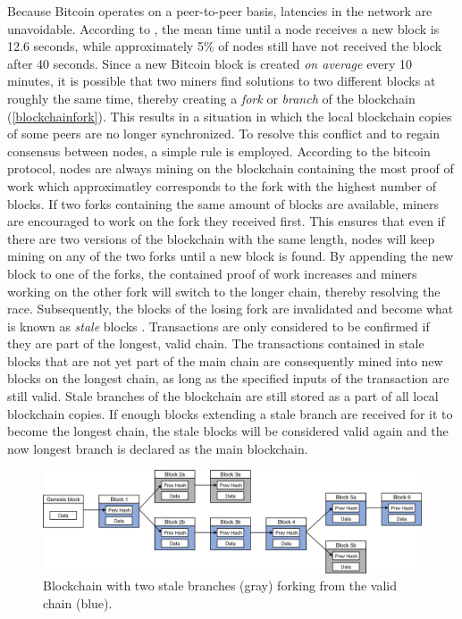\documentclass[a4paper,12pt,twoside]{report}
\begin{document}
Because Bitcoin operates on a peer-to-peer basis, latencies in the network are unavoidable. According to \cite{infoprop}, the mean time until a
node receives a new block is 12.6 seconds, while approximately 5\% of nodes still have not received the block after 40 seconds. Since a new Bitcoin block is created \textit{on average} every 10 minutes, it is possible that two miners find solutions to two different blocks at roughly the same time, thereby creating a \textit{fork} or \textit{branch} of the blockchain (\autoref{blockchainfork}). This results in a situation in which the local blockchain copies of some peers are no longer synchronized. To resolve this conflict and to regain consensus between nodes, a simple rule is employed. According to the bitcoin protocol, nodes are always mining on the blockchain containing the most proof of work which approximatley corresponds to the fork with the highest number of blocks. If two forks containing the same amount of blocks are available, miners are encouraged to work on the fork they received first. This ensures that even if there are two versions of the blockchain with the same length, nodes will keep mining on any of the two forks until a new block is found. By appending the new block to one of the forks, the contained proof of work increases and miners working on the other fork will switch to the longer chain, thereby resolving the race. Subsequently, the blocks of the losing fork are invalidated and become what is known as \textit{stale} blocks \cite{okupski2014bitcoin}. Transactions are only considered to be confirmed if they are part of the longest, valid chain. The transactions contained in stale blocks that are not yet part of the main chain are consequently mined into new blocks on the longest chain, as long as the specified inputs of the transaction are still valid. Stale branches of the blockchain are still stored as a part of all local blockchain copies. If enough blocks extending a stale branch are received for it to become the longest chain, the stale blocks will be considered valid again and the now longest branch is declared as the main blockchain.
\begin{figure}[ht]
	\centering
  \includegraphics[width=\textwidth]{BlockchainFork.png}
	\caption{Blockchain with two stale branches (gray) forking from the valid chain (blue). }
	\label{blockchainfork}
\end{figure}
\end{document}
